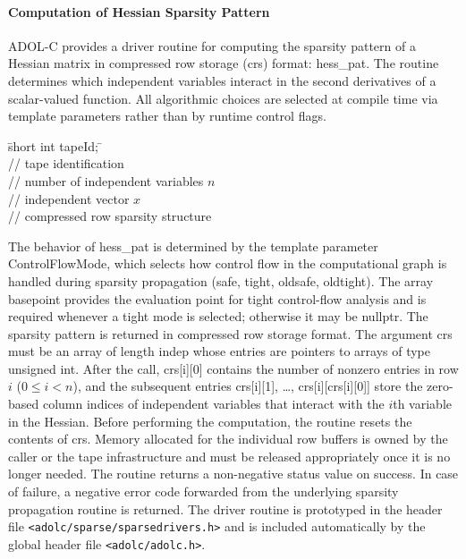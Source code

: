 \documentclass[11pt,twoside]{article}
\begin{document}
\paragraph{Computation of Hessian Sparsity Pattern}
%
ADOL-C provides a driver routine for computing the sparsity pattern of a
Hessian matrix in compressed row storage (crs) format:
{\sf hess\_pat}. The routine determines which independent variables
interact in the second derivatives of a scalar-valued function.
%
All algorithmic choices are selected at compile time via template
parameters rather than by runtime control flags.
%
\begin{tabbing}
\hspace{0.5in}\={\sf short int tapeId;} \hspace{1.3in}\= \kill
{}\\
        \> // tape identification \\
               \> // number of independent variables $n$ \\
 \> // independent vector $x$ \\
    \> // compressed row sparsity structure \\
\end{tabbing}
%
The behavior of {\sf hess\_pat} is determined by the template parameter
{\sf ControlFlowMode}, which selects how control flow in the
computational graph is handled during sparsity propagation
(safe, tight, oldsafe, oldtight).
%
The array {\sf basepoint} provides the evaluation point for tight
control-flow analysis and is required whenever a tight mode is selected;
otherwise it may be {\sf nullptr}.
%
The sparsity pattern is returned in compressed row storage format.  The
argument {\sf crs} must be an array of length {\sf indep} whose entries
are pointers to arrays of type {\sf unsigned int}. After the call,
{\sf crs[i][0]} contains the number of nonzero entries in row $i$
($0 \le i < n$), and the subsequent entries
{\sf crs[i][1]}, \ldots, {\sf crs[i][crs[i][0]]} store the zero-based
column indices of independent variables that interact with the $i$th
variable in the Hessian.
%
Before performing the computation, the routine resets the contents of
{\sf crs}. Memory allocated for the individual row buffers is owned by
the caller or the tape infrastructure and must be released
appropriately once it is no longer needed.
%
The routine returns a non-negative status value on success. In case of
failure, a negative error code forwarded from the underlying sparsity
propagation routine is returned.
%
The driver routine is prototyped in the header file
\verb=<adolc/sparse/sparsedrivers.h>= and is included automatically by
the global header file \verb=<adolc/adolc.h>=.
\end{document}
